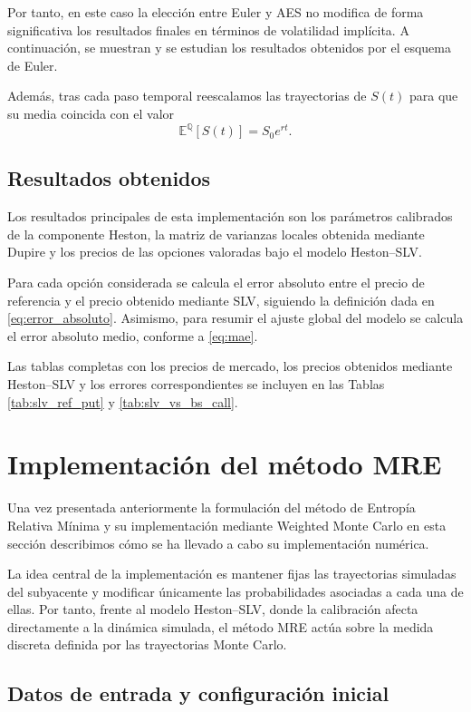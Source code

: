 Por tanto, en este caso la elección entre Euler y AES no modifica de forma significativa los resultados finales en términos de volatilidad implícita. A continuación, se muestran y se estudian los resultados obtenidos por el esquema de Euler. \medskip

Además, tras cada paso temporal reescalamos las trayectorias de \(S(t)\) para que su media coincida con el valor
\[
    \mathbb{E}^{\mathbb{Q}}[S(t)] = S_0 e^{rt}.
\]

\subsection{Resultados obtenidos}

Los resultados principales de esta implementación son los parámetros calibrados de la componente Heston, la matriz de varianzas locales obtenida mediante Dupire y los precios de las opciones valoradas bajo el modelo Heston--SLV.

Para cada opción considerada se calcula el error absoluto entre el precio de referencia y el precio obtenido mediante SLV, siguiendo la definición dada en \ref{eq:error_absoluto}. Asimismo, para resumir el ajuste global del modelo se calcula el error absoluto medio, conforme a \ref{eq:mae}.

Las tablas completas con los precios de mercado, los precios obtenidos mediante Heston--SLV y los errores correspondientes se incluyen en las Tablas \ref{tab:slv_ref_put} y \ref{tab:slv_vs_bs_call}. 
\section{Implementación del método MRE}
\label{sec:implementacion_mre}

Una vez presentada anteriormente la formulación del método de Entropía Relativa Mínima y su implementación mediante Weighted Monte Carlo en esta sección describimos cómo se ha llevado a cabo su implementación numérica. \medskip

La idea central de la implementación es mantener fijas las trayectorias simuladas del subyacente y modificar únicamente las probabilidades asociadas a cada una de ellas. Por tanto, frente al modelo Heston--SLV, donde la calibración afecta directamente a la dinámica simulada, el método MRE actúa sobre la medida discreta definida por las trayectorias Monte Carlo.

\subsection{Datos de entrada y configuración inicial}

